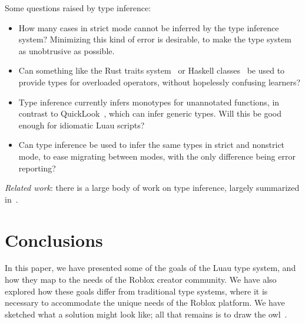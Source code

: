 \documentclass[acmsmall]{acmart}
\begin{document}
Some questions raised by type inference:
\begin{itemize}

\item How many cases in strict mode cannot be inferred by the type inference system? Minimizing
  this kind of error is desirable, to make the type system as unobtrusive as possible.
\item Can something like the Rust traits system~\cite{RustBook} or Haskell classes~\cite{TypeClasses} be used to provide types for overloaded operators, without hopelessly confusing learners?
\item Type inference currently infers monotypes for unannotated
  functions, in contrast to QuickLook~\cite{QuickLook}, which can infer generic types.
  Will this be good enough for idiomatic Luau scripts?
\item Can type inference be used to infer the same types in strict and nonstrict mode, to ease migrating between modes, with the only difference being error reporting?
\end{itemize}
\emph{Related work}: there is a large body of work on type inference, largely summarized in~\cite{TAPL}.

\section{Conclusions}

In this paper, we have presented some of the goals of the Luau type
system, and how they map to the needs of the Roblox creator
community. We have also explored how these goals differ from traditional
type systems, where it is necessary to accommodate the unique needs of
the Roblox platform. We have sketched what a solution might look like;
all that remains is to draw the owl~\cite{HowToDrawAnOwl}.

 
\end{document}

